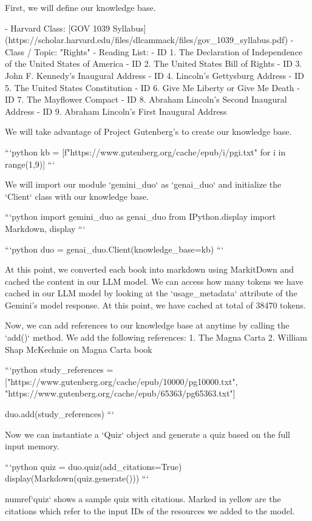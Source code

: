 {{First, we will define our knowledge base. 

- Harvard Class: [GOV 1039 Syllabus](https://scholar.harvard.edu/files/dlcammack/files/gov_1039_syllabus.pdf)
- Class / Topic: "Rights"
- Reading List:
    - ID 1. The Declaration of Independence of the United States of America
    - ID 2. The United States Bill of Rights
    - ID 3. John F. Kennedy's Inaugural Address
    - ID 4. Lincoln's Gettysburg Address
    - ID 5. The United States Constitution
    - ID 6. Give Me Liberty or Give Me Death
    - ID 7. The Mayflower Compact
    - ID 8. Abraham Lincoln's Second Inaugural Address
    - ID 9. Abraham Lincoln's First Inaugural Address

We will take advantage of Project Gutenberg's to create our knowledge base.


```python
kb = [f"https://www.gutenberg.org/cache/epub/{i}/pg{i}.txt" for i in range(1,9)]
```

We will import our module `gemini_duo` as `genai_duo` and initialize the `Client` class with our knowledge base.


```python
import gemini_duo as genai_duo
from IPython.display import Markdown, display
```


```python
duo = genai_duo.Client(knowledge_base=kb)
```

At this point, we converted each book into markdown using MarkitDown and cached the content in our LLM model. We can access how many tokens we have cached in our LLM model by looking at the `usage_metadata` attribute of the Gemini's model response. At this point, we have cached at total of 38470 tokens.

Now, we can add references to our knowledge base at anytime by calling the `add()` method. We add the following references:
1. The Magna Carta
2. William Shap McKechnie on Magna Carta book


```python
study_references = ["https://www.gutenberg.org/cache/epub/10000/pg10000.txt", "https://www.gutenberg.org/cache/epub/65363/pg65363.txt"]

duo.add(study_references)
```

Now we can instantiate a `Quiz` object and generate a quiz based on the full input memory.


```python
quiz = duo.quiz(add_citations=True)
display(Markdown(quiz.generate()))
```

{numref}`quiz` shows a sample quiz with citations. Marked in yellow are the citations which refer to the input IDs of the resources we added to the model.

}}
